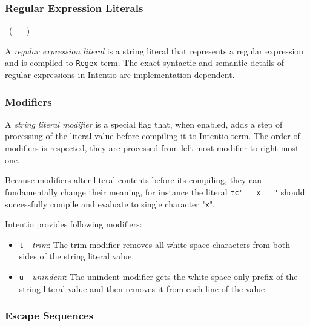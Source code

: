 \subsubsection*{Regular Expression Literals}

\begin{bnf}
   \eq {} \ ( \  \gor {} \ )
\end{bnf}

A \emph{regular expression literal} is a string literal that represents a regular expression and is compiled to \lstinline{Regex} term. The exact syntactic and semantic details of regular expressions in Intentio are implementation dependent.

\subsubsection*{Modifiers}

\begin{bnf}
   \eq {} \gor {}
\end{bnf}

A \emph{string literal modifier} is a special flag that, when enabled, adds a step of processing of the literal value before compiling it to Intentio term. The order of modifiers is respected, they are processed from left-most modifier to right-most one.

Because modifiers alter literal contents before its compiling, they can fundamentally change their meaning, for instance the literal \lstinline{tc"   x   "} should successfully compile and evaluate to single character "\texttt{x}".

Intentio provides following modifiers:

\begin{itemize}
  \item \texttt{t} - \emph{trim}: The trim modifier removes all white space characters from both sides of the string literal value.
  \item \texttt{u} - \emph{unindent}: The unindent modifier gets the white-space-only prefix of the string literal value and then removes it from each line of the value.
\end{itemize}

\subsubsection*{Escape Sequences}

